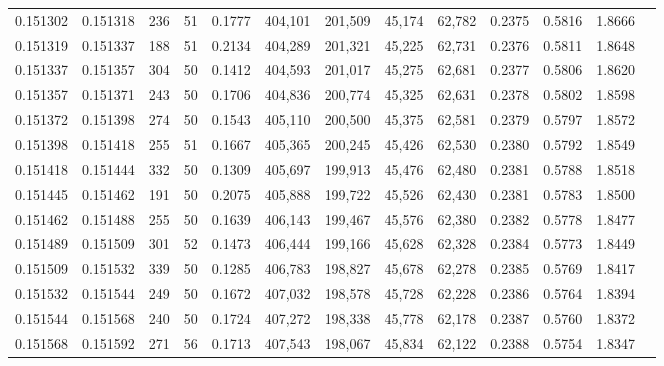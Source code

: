 \begin{tabular}{rrrrrrrrrrrrr}
0.151302 & 0.151318 &   236 &  51 &                                     0.1777 & 404,101 & 201,509 &  45,174 &  62,782 & 0.2375 & 0.5816 & 1.8666 \\
0.151319 & 0.151337 &   188 &  51 &                                     0.2134 & 404,289 & 201,321 &  45,225 &  62,731 & 0.2376 & 0.5811 & 1.8648 \\
0.151337 & 0.151357 &   304 &  50 &                                     0.1412 & 404,593 & 201,017 &  45,275 &  62,681 & 0.2377 & 0.5806 & 1.8620 \\
0.151357 & 0.151371 &   243 &  50 &                                     0.1706 & 404,836 & 200,774 &  45,325 &  62,631 & 0.2378 & 0.5802 & 1.8598 \\
0.151372 & 0.151398 &   274 &  50 &                                     0.1543 & 405,110 & 200,500 &  45,375 &  62,581 & 0.2379 & 0.5797 & 1.8572 \\
0.151398 & 0.151418 &   255 &  51 &                                     0.1667 & 405,365 & 200,245 &  45,426 &  62,530 & 0.2380 & 0.5792 & 1.8549 \\
0.151418 & 0.151444 &   332 &  50 &                                     0.1309 & 405,697 & 199,913 &  45,476 &  62,480 & 0.2381 & 0.5788 & 1.8518 \\
0.151445 & 0.151462 &   191 &  50 &                                     0.2075 & 405,888 & 199,722 &  45,526 &  62,430 & 0.2381 & 0.5783 & 1.8500 \\
0.151462 & 0.151488 &   255 &  50 &                                     0.1639 & 406,143 & 199,467 &  45,576 &  62,380 & 0.2382 & 0.5778 & 1.8477 \\
0.151489 & 0.151509 &   301 &  52 &                                     0.1473 & 406,444 & 199,166 &  45,628 &  62,328 & 0.2384 & 0.5773 & 1.8449 \\
0.151509 & 0.151532 &   339 &  50 &                                     0.1285 & 406,783 & 198,827 &  45,678 &  62,278 & 0.2385 & 0.5769 & 1.8417 \\
0.151532 & 0.151544 &   249 &  50 &                                     0.1672 & 407,032 & 198,578 &  45,728 &  62,228 & 0.2386 & 0.5764 & 1.8394 \\
0.151544 & 0.151568 &   240 &  50 &                                     0.1724 & 407,272 & 198,338 &  45,778 &  62,178 & 0.2387 & 0.5760 & 1.8372 \\
0.151568 & 0.151592 &   271 &  56 &                                     0.1713 & 407,543 & 198,067 &  45,834 &  62,122 & 0.2388 & 0.5754 & 1.8347 \\

\end{tabular}
